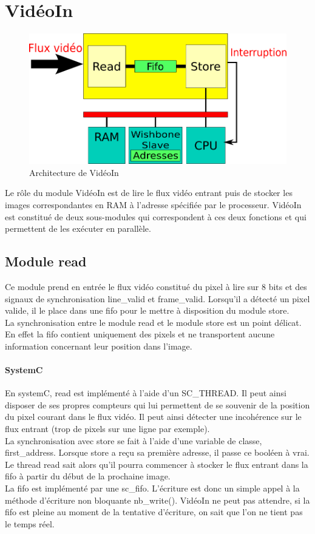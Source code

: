 \documentclass[a4paper,12pt]{report}
\begin{document}
    \section{VidéoIn}

\begin{figure}[!h]
	\centering
	\includegraphics[scale = 0.5]{video_in.png}
	\caption{Architecture de VidéoIn}
\end{figure}

Le rôle du module VidéoIn est de lire le flux vidéo entrant puis de stocker les images correspondantes en RAM à l'adresse spécifiée par le processeur.
VidéoIn est constitué de deux sous-modules qui correspondent à ces deux fonctions et qui permettent de les exécuter en parallèle. 


\subsection{Module read}
Ce module prend en entrée le flux vidéo constitué du pixel à lire sur 8 bits et des signaux de synchronisation line\_valid et frame\_valid.
Lorsqu'il a détecté un pixel valide, il le place dans une fifo pour le mettre à disposition du module store.\\
La synchronisation entre le module read et le module store est un point délicat. 
En effet la fifo contient uniquement des pixels et ne transportent aucune information concernant leur position dans l'image. 

\paragraph{SystemC}
En systemC, read est implémenté à l'aide d'un SC\_THREAD. 
Il peut ainsi disposer de ses propres compteurs qui lui permettent de se souvenir de la position
du pixel courant dans le flux vidéo.
Il peut ainsi détecter une incohérence sur le flux entrant (trop de pixels sur une ligne par exemple).\\ 
La synchronisation avec store se fait à l'aide d'une variable de classe, first\_address. 
Lorsque store a reçu sa première adresse, il passe ce booléen à vrai.
Le thread read sait alors qu'il pourra commencer à stocker le flux entrant dans la fifo à partir du début de la prochaine image.\\
La fifo est implémenté par une sc\_fifo. 
L'écriture est donc un simple appel à la méthode d'écriture non bloquante nb\_write().
VidéoIn ne peut pas attendre,
si la fifo est pleine au moment de la tentative d'écriture, on sait que l'on ne tient pas le temps réel. 
\end{document}
